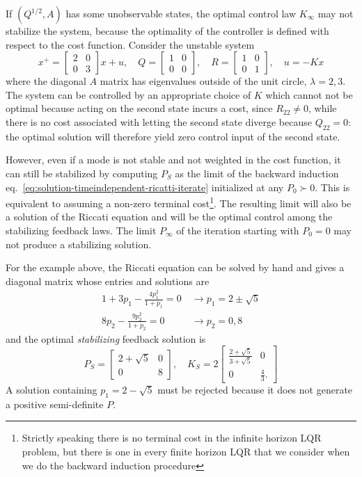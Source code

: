 If $(Q^{1/2},A)$ has some unobservable states, the optimal control law $K_\infty$ may not stabilize the system, because the optimality of the controller is defined with respect to the cost function. Consider the unstable system
\begin{equation*}
  x^+ =
  \begin{bmatrix}
    2 & 0 \\ 0 & 3
  \end{bmatrix}x + u, \quad Q =
  \begin{bmatrix}
    1 & 0 \\ 0 & 0
  \end{bmatrix}, \quad R =
  \begin{bmatrix}
    1 & 0 \\ 0 & 1
  \end{bmatrix},\quad u =-Kx
\end{equation*}
where the diagonal $A$ matrix has eigenvalues outside of the unit circle, $\lambda=2,3$. The system can be controlled by an appropriate choice of $K$ which cannot not be optimal because acting on the second state incurs a cost, since $R_{22}\neq 0$, while there is no cost associated with letting the second state diverge because $Q_{22}=0$: the optimal solution will therefore yield zero control input of the second state.

However, even if a mode is not stable and not weighted in the cost function, it can still be stabilized by computing $P_S$ as the limit of the backward induction eq.~\eqref{eq:solution-timeindependent-ricatti-iterate} initialized at any $P_0\succ 0$.
This is equivalent to assuming a non-zero terminal cost\footnote{Strictly speaking there is no terminal cost in the infinite horizon LQR problem, but there is one in every finite horizon LQR that we consider when we do the backward induction procedure}.
The resulting limit will also be a solution of the Riccati equation and will be the optimal control among the stabilizing feedback laws.
The limit $P_\infty$ of the iteration starting with $P_0=0$ may not produce a stabilizing solution.

For the example above, the Riccati equation can be solved by hand and gives a diagonal matrix whose entries and solutions are
\begin{align*}
  1 + 3p_1 - \frac{4p_1^2}{1+p_1} = 0\ &\rightarrow p_1 = 2\pm \sqrt{5} \\
  8p_2 - \frac{9p_2^2}{1+p_2} = 0\ &\rightarrow p_2 = 0, 8
\end{align*}
and the optimal \emph{stabilizing} feedback solution is
\begin{equation*}
  P_S =
  \begin{bmatrix}
    2 + \sqrt{5} & 0 \\ 0 & 8
  \end{bmatrix},\quad K_S =
  2\begin{bmatrix}
    \frac{2+\sqrt{5}}{3+\sqrt{5}} & 0 \\ 0 & \frac{4}{3}.
  \end{bmatrix}
\end{equation*}
A solution containing $p_1=2-\sqrt{5}$ must be rejected because it does not generate a positive semi-definite $P$.

